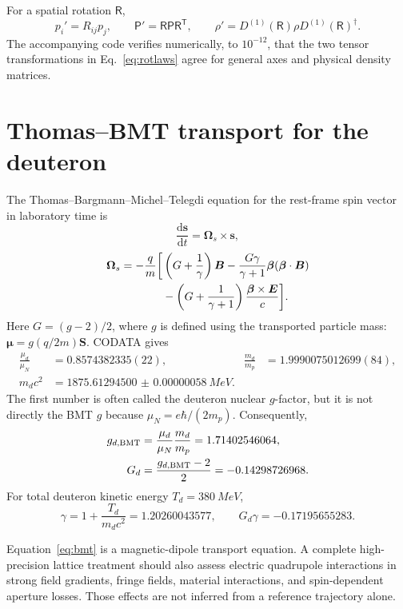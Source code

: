 \documentclass[11pt,a4paper]{article}
\newcommand{\dd}{\mathrm{d}}
\newcommand{\R}{\mathsf{R}}
\newcommand{\T}{\mathsf{P}}
\begin{document}
For a spatial rotation $\R$,
\begin{equation}
 p_i'=R_{ij}p_j,\qquad \T'=\R\T\R^{\mathsf T},\qquad
 \rho'=D^{(1)}(\R)\rho D^{(1)}(\R)^\dagger. \label{eq:rotlaws}
\end{equation}
The accompanying code verifies numerically, to $10^{-12}$, that the two tensor transformations in Eq.~\eqref{eq:rotlaws} agree for general axes and physical density matrices.

\section{Thomas--BMT transport for the deuteron}

The Thomas--Bargmann--Michel--Telegdi equation \citep{Bargmann1959} for the rest-frame spin vector in laboratory time is
\begin{equation}
 \frac{\dd\bm s}{\dd t}=\bm\Omega_s\times\bm s,
\end{equation}
\begin{align}
 \bm\Omega_s=-\frac{q}{m}\bigg[&\left(G+\frac1\gamma\right)\bm B
 -\frac{G\gamma}{\gamma+1}\bm\beta(\bm\beta\cdot\bm B) \notag\\
 &-\left(G+\frac1{\gamma+1}\right)\frac{\bm\beta\times\bm E}{c}\bigg]. \label{eq:bmt}
\end{align}
Here $G=(g-2)/2$, where $g$ is defined using the transported particle mass: $\bm\mu=g(q/2m)\bm S$.  CODATA gives \citep{Mohr2025CODATA}
\begin{align}
 \frac{\mu_d}{\mu_N}&=0.8574382335(22), &
 \frac{m_d}{m_p}&=1.9990075012699(84),\\
 m_dc^2&=\SI{1875.61294500(58)}{MeV}. &&
\end{align}
The first number is often called the deuteron nuclear $g$-factor, but it is not directly the BMT $g$ because $\mu_N=e\hbar/(2m_p)$.  Consequently,
\begin{align}
 g_{d,\rm BMT}&=\frac{\mu_d}{\mu_N}\frac{m_d}{m_p}=1.71402546064,\\
 G_d&=\frac{g_{d,\rm BMT}-2}{2}=-0.14298726968. \label{eq:Gd}
\end{align}
For total deuteron kinetic energy $T_d=\SI{380}{MeV}$,
\begin{equation}
 \gamma=1+\frac{T_d}{m_dc^2}=1.20260043577,\qquad
 G_d\gamma=-0.17195655283. \label{eq:Ggamma}
\end{equation}

Equation~\eqref{eq:bmt} is a magnetic-dipole transport equation.  A complete high-precision lattice treatment should also assess electric quadrupole interactions in strong field gradients, fringe fields, material interactions, and spin-dependent aperture losses.  Those effects are not inferred from a reference trajectory alone.
\end{document}

